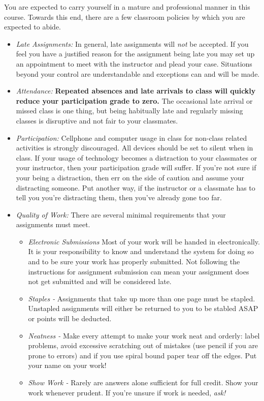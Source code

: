 \documentclass[10pt]{article}
\begin{document}
You are expected to carry yourself in a mature and professional manner in this course. Towards this end, there are a few classroom policies by which you are expected to abide.
\begin{itemize}

\item \textit{Late Assignments: } In general, late assignments will \textit{not} be accepted.  If you feel you have a justified reason for the assignment being late you may set up an appointment to meet with the instructor and plead your case.  Situations beyond your control are understandable and exceptions can and will be made. 

\item \textit{Attendance: } \textbf{Repeated absences and late arrivals to class will quickly reduce your participation grade to zero.}  The occasional late arrival or missed class is one thing, but being habitually late and regularly missing classes is disruptive and not fair to your classmates.  

\item \textit{Participation: }  Cellphone and computer usage in class for non-class related activities is strongly discouraged.  All devices should be set to silent when in class.  If your usage of technology becomes a distraction to your classmates or your instructor, then your participation grade will suffer.  If you're not sure if your being a distraction, then err on the side of caution and assume your distracting someone.  Put another way, if the instructor or a classmate has to tell you you're distracting them, then you've already gone too far. 

\item \textit{Quality of Work:} There are several minimal requirements that your assignments must meet.
\begin{itemize}
\item \textit{Electronic Submissions}  Most of your work will be handed in electronically.  It is your responsibility to know and understand the system for doing so and to be sure your work has properly submitted. Not following the instructions for assignment submission can mean your assignment does not get submitted and will be considered late. 

\item \textit{Staples - } Assignments that take up more than one page must be stapled.  Unstapled assignments will either be returned to you to be stabled ASAP or points will be deducted.  

\item \textit{Neatness - }  Make every attempt to make your work neat and orderly:  label problems, avoid excessive scratching out of mistakes (use pencil if you are prone to errors) and if you use spiral bound paper tear off the edges. Put your name on your work!

\item \textit{Show Work - } Rarely are answers alone sufficient for full credit.  Show your work whenever prudent.  If you're unsure if work is needed, \textit{ask!}
\end{itemize}

\end{itemize}
\end{document}
